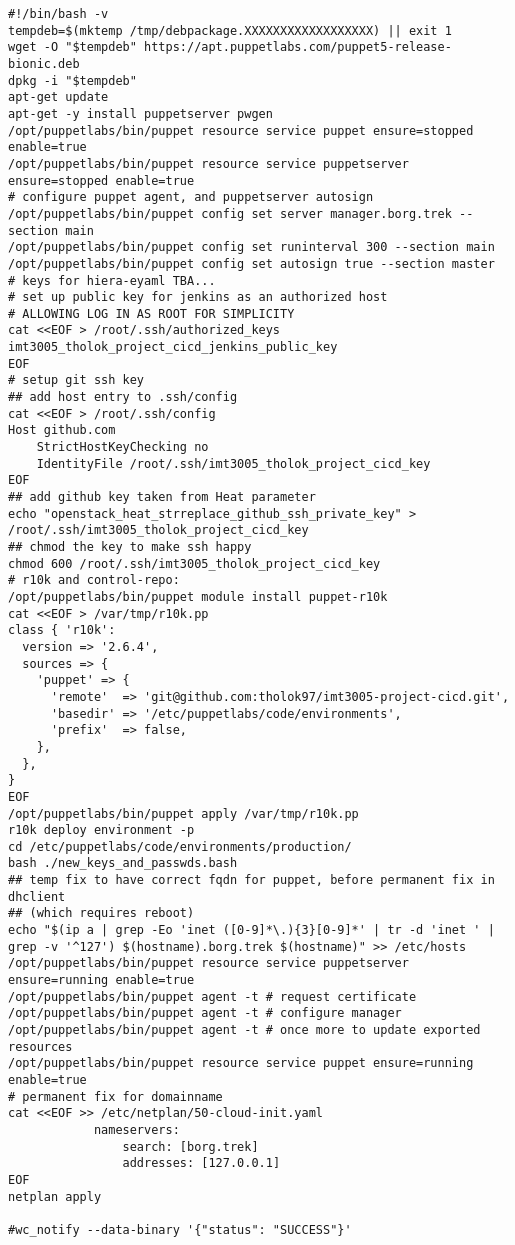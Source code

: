 \begin{verbatim}
#!/bin/bash -v
tempdeb=$(mktemp /tmp/debpackage.XXXXXXXXXXXXXXXXXX) || exit 1
wget -O "$tempdeb" https://apt.puppetlabs.com/puppet5-release-bionic.deb
dpkg -i "$tempdeb"
apt-get update
apt-get -y install puppetserver pwgen
/opt/puppetlabs/bin/puppet resource service puppet ensure=stopped enable=true
/opt/puppetlabs/bin/puppet resource service puppetserver ensure=stopped enable=true
# configure puppet agent, and puppetserver autosign
/opt/puppetlabs/bin/puppet config set server manager.borg.trek --section main
/opt/puppetlabs/bin/puppet config set runinterval 300 --section main
/opt/puppetlabs/bin/puppet config set autosign true --section master
# keys for hiera-eyaml TBA...
# set up public key for jenkins as an authorized host
# ALLOWING LOG IN AS ROOT FOR SIMPLICITY
cat <<EOF > /root/.ssh/authorized_keys
imt3005_tholok_project_cicd_jenkins_public_key
EOF
# setup git ssh key
## add host entry to .ssh/config
cat <<EOF > /root/.ssh/config
Host github.com
    StrictHostKeyChecking no
    IdentityFile /root/.ssh/imt3005_tholok_project_cicd_key
EOF
## add github key taken from Heat parameter
echo "openstack_heat_strreplace_github_ssh_private_key" > /root/.ssh/imt3005_tholok_project_cicd_key
## chmod the key to make ssh happy
chmod 600 /root/.ssh/imt3005_tholok_project_cicd_key
# r10k and control-repo:
/opt/puppetlabs/bin/puppet module install puppet-r10k
cat <<EOF > /var/tmp/r10k.pp
class { 'r10k':
  version => '2.6.4',
  sources => {
    'puppet' => {
      'remote'  => 'git@github.com:tholok97/imt3005-project-cicd.git',
      'basedir' => '/etc/puppetlabs/code/environments',
      'prefix'  => false,
    },
  },
}
EOF
/opt/puppetlabs/bin/puppet apply /var/tmp/r10k.pp
r10k deploy environment -p
cd /etc/puppetlabs/code/environments/production/
bash ./new_keys_and_passwds.bash
## temp fix to have correct fqdn for puppet, before permanent fix in dhclient
## (which requires reboot)
echo "$(ip a | grep -Eo 'inet ([0-9]*\.){3}[0-9]*' | tr -d 'inet ' | grep -v '^127') $(hostname).borg.trek $(hostname)" >> /etc/hosts
/opt/puppetlabs/bin/puppet resource service puppetserver ensure=running enable=true
/opt/puppetlabs/bin/puppet agent -t # request certificate
/opt/puppetlabs/bin/puppet agent -t # configure manager
/opt/puppetlabs/bin/puppet agent -t # once more to update exported resources
/opt/puppetlabs/bin/puppet resource service puppet ensure=running enable=true
# permanent fix for domainname
cat <<EOF >> /etc/netplan/50-cloud-init.yaml
            nameservers:
                search: [borg.trek]
                addresses: [127.0.0.1]
EOF
netplan apply

#wc_notify --data-binary '{"status": "SUCCESS"}'
\end{verbatim}



